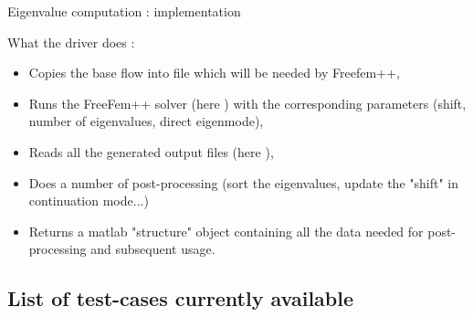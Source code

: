 \documentclass{beamer}
\newcommand{\ssp}{\vspace{.2cm} }
\begin{document}
\begin{frame}{Eigenvalue computation : implementation}

\small






\ssp

What the  driver does :

\begin{itemize}[<+->]
\item Copies the base flow into file  which will be needed by Freefem++,

\item Runs the FreeFem++ solver (here )  with the corresponding parameters (shift, number of eigenvalues, direct eigenmode),


\item Reads all the generated output files (here ), 

\item Does a number of post-processing (sort the eigenvalues, update the "shift" in continuation mode...)

\item Returns a matlab "structure" object containing all the data needed for post-processing and subsequent usage.
 
\end{itemize}

\end{frame}

\subsection{List of test-cases currently available}
\end{document}
